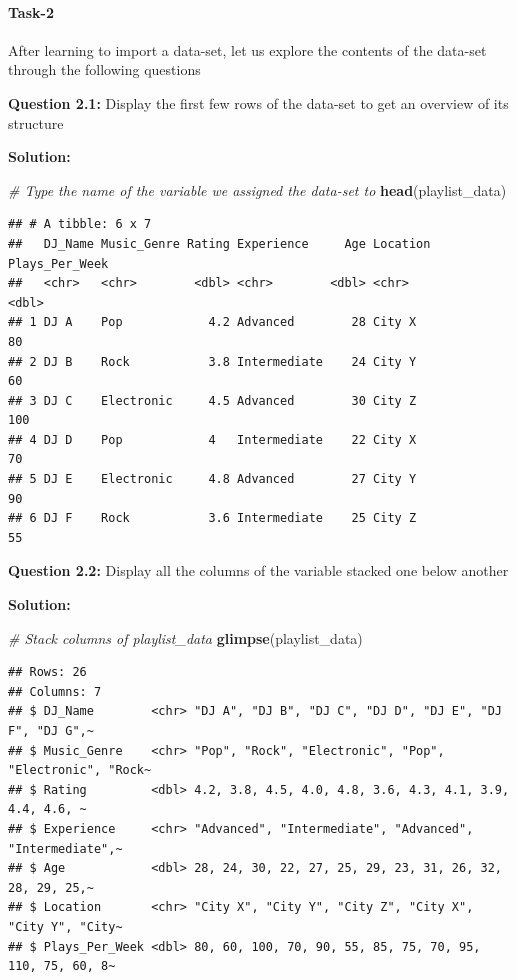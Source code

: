 \documentclass[
]{article}
\newenvironment{Shaded}{\begin{snugshade}}{\end{snugshade}}
\newcommand{\CommentTok}[1]{\textcolor[rgb]{0.56,0.35,0.01}{\textit{#1}}}
\newcommand{\FunctionTok}[1]{\textcolor[rgb]{0.13,0.29,0.53}{\textbf{#1}}}
\newcommand{\NormalTok}[1]{#1}
\begin{document}
\hypertarget{task-2}{%
\paragraph{Task-2}\label{task-2}}

After learning to import a data-set, let us explore the contents of the
data-set through the following questions

\textbf{Question 2.1:} Display the first few rows of the data-set to get
an overview of its structure

\textbf{Solution:}

\begin{Shaded}
\begin{Highlighting}[]
\CommentTok{\# Type the name of the variable we assigned the data{-}set to}
\FunctionTok{head}\NormalTok{(playlist\_data)}
\end{Highlighting}
\end{Shaded}

\begin{verbatim}
## # A tibble: 6 x 7
##   DJ_Name Music_Genre Rating Experience     Age Location Plays_Per_Week
##   <chr>   <chr>        <dbl> <chr>        <dbl> <chr>             <dbl>
## 1 DJ A    Pop            4.2 Advanced        28 City X               80
## 2 DJ B    Rock           3.8 Intermediate    24 City Y               60
## 3 DJ C    Electronic     4.5 Advanced        30 City Z              100
## 4 DJ D    Pop            4   Intermediate    22 City X               70
## 5 DJ E    Electronic     4.8 Advanced        27 City Y               90
## 6 DJ F    Rock           3.6 Intermediate    25 City Z               55
\end{verbatim}

\textbf{Question 2.2:} Display all the columns of the variable stacked
one below another

\textbf{Solution:}

\begin{Shaded}
\begin{Highlighting}[]
\CommentTok{\# Stack columns of playlist\_data}
\FunctionTok{glimpse}\NormalTok{(playlist\_data)}
\end{Highlighting}
\end{Shaded}

\begin{verbatim}
## Rows: 26
## Columns: 7
## $ DJ_Name        <chr> "DJ A", "DJ B", "DJ C", "DJ D", "DJ E", "DJ F", "DJ G",~
## $ Music_Genre    <chr> "Pop", "Rock", "Electronic", "Pop", "Electronic", "Rock~
## $ Rating         <dbl> 4.2, 3.8, 4.5, 4.0, 4.8, 3.6, 4.3, 4.1, 3.9, 4.4, 4.6, ~
## $ Experience     <chr> "Advanced", "Intermediate", "Advanced", "Intermediate",~
## $ Age            <dbl> 28, 24, 30, 22, 27, 25, 29, 23, 31, 26, 32, 28, 29, 25,~
## $ Location       <chr> "City X", "City Y", "City Z", "City X", "City Y", "City~
## $ Plays_Per_Week <dbl> 80, 60, 100, 70, 90, 55, 85, 75, 70, 95, 110, 75, 60, 8~
\end{verbatim}
\end{document}
